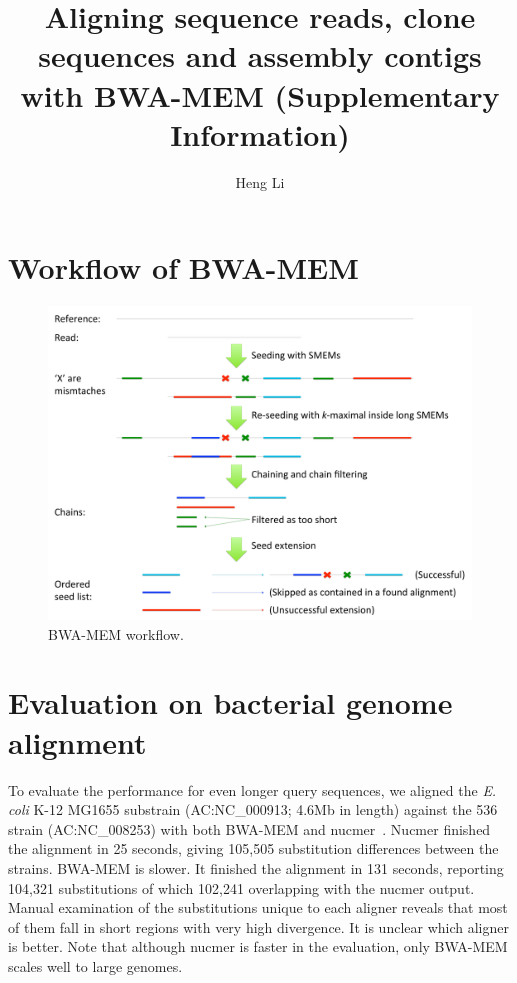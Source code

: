 \documentclass[10pt,pdftex]{article}
\title{Aligning sequence reads, clone sequences and assembly contigs with BWA-MEM (Supplementary Information)}
\author{Heng Li}
\date{}
\begin{document}
\maketitle

\section{Workflow of BWA-MEM}

\begin{figure}[!htb]
\includegraphics[width=\textwidth]{mem-flow}
\caption{BWA-MEM workflow.}
\end{figure}

\section{Evaluation on bacterial genome alignment}
To evaluate the performance for even longer query sequences, we aligned the
{\it E. coli} K-12 MG1655 substrain (AC:NC\_000913; 4.6Mb in length) against
the 536 strain (AC:NC\_008253) with both BWA-MEM and
nucmer~\citep{Kurtz:2004zr}. Nucmer finished the alignment in 25 seconds,
giving 105,505 substitution differences between the strains. BWA-MEM is slower.
It finished the alignment in 131 seconds, reporting 104,321 substitutions of
which 102,241 overlapping with the nucmer output. Manual examination of the
substitutions unique to each aligner reveals that most of them fall in short
regions with very high divergence. It is unclear which aligner is better. Note
that although nucmer is faster in the evaluation, only BWA-MEM scales well to
large genomes.
\end{document}
